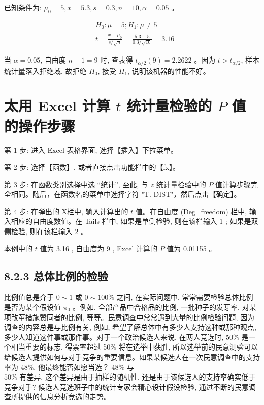 \documentclass[10pt]{article}
\begin{document}
\begin{CJK*}{UTF8}{bsmi}
已知条件为: $\mu_{0}=5, \bar{x}=5.3, s=0.3, n=10, \alpha=0.05$ 。

$$
\begin{aligned}
& H_{0}: \mu=5 ; H_{1}: \mu \neq 5 \\
& t=\frac{\bar{x}-\mu_{0}}{s / \sqrt{n}}=\frac{5.3-5}{0.3 / \sqrt{10}}=3.16
\end{aligned}
$$

当 $\alpha=0.05$, 自由度 $n-1=9$ 时, 查表得 $t_{\alpha / 2}(9)=2.2622$ 。因为 $t>t_{\alpha / 2}$, 样本统计量落入拒绝域, 故拒绝 $H_{0}$, 接受 $H_{1}$, 说明该机器的性能不好。

\section*{太用 Excel 计算 $t$ 统计量检验的 $P$ 值的操作步骤}
第 1 步: 进入 Excel 表格界面, 选择【插入】下拉菜单。

第 2 步: 选择【函数】, 或者直接点击功能栏中的【fx】。

第 3 步: 在函数类别选择中选 “统计”, 至此, 与 $z$ 统计量检验中的 $P$ 值计算步骤完全相同。随后，在函数名的菜单中选择字符 "T. DIST"，然后点击【确定】。

第 4 步: 在弹出的 X栏中, 输入计算出的 $t$ 值。在自由度 (Deg\_freedom) 栏中, 输入相应的自由度数值。在 Tails 栏中, 如果是单侧检验, 则在该栏输入 1 ; 如果是双侧检验, 则在该栏输入 2 。

本例中的 $t$ 值为 3.16 , 自由度为 9 , Excel 计算的 $P$ 值为 0.01155 。

\subsection*{8.2.3 总体比例的检验}
比例值总是介于 $0 \sim 1$ 或 $0 \sim 100 \%$ 之间, 在实际问题中, 常常需要检验总体比例是否为某个假设值 $\pi_{0}$ 。例如, 全部产品中合格品的比例, 一批种子的发芽率, 对某项改革措施赞同者的比例, 等等。民意调查中常常遇到大量的比例检验问题, 因为调查的内容总是与比例有关, 例如, 希望了解总体中有多少人支持这种或那种观点, 多少人知道这件事或那件事。对于一个政治候选人来说, 在两人竞选时, $50 \%$ 是一个相当重要的标志, 得票率超过 50\% 将在选举中获胜, 所以选举前的民意测验可以给候选人提供如何与对手竞争的重要信息。如果某候选人在一次民意调查中的支持率为 $48 \%$, 他最终能否如愿当选？ $48 \%$ 与\\
$50 \%$ 有差异, 这个差异是由于抽样的随机性, 还是由于该候选人的支持率确实低于竞争对手? 候选人竞选班子中的统计专家会精心设计假设检验, 通过不断的民意调查所提供的信息分析竞选的走势。


\end{CJK*}
\end{document}
